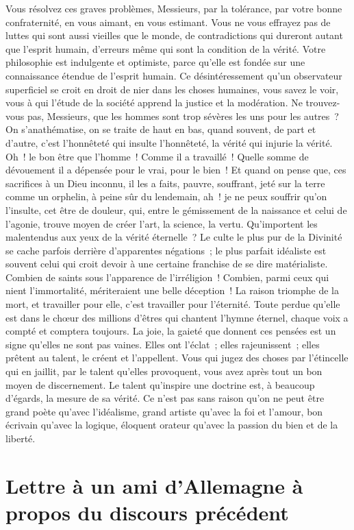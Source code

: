\documentclass[french,twoside]{book} %
\newcommand\persName[1]{#1}
\newcommand\placeName[1]{#1}
\begin{document}
Vous résolvez ces graves problèmes, Messieurs, par la tolérance, par votre bonne confraternité, en vous aimant, en vous estimant. Vous ne vous effrayez pas de luttes qui sont aussi vieilles que le monde, de contradictions qui dureront autant que l’esprit humain, d’erreurs même qui sont la condition de la vérité. Votre philosophie est indulgente et optimiste, parce qu’elle est fondée sur une connaissance étendue de l’esprit humain. Ce désintéressement qu’un observateur superficiel se croit en droit de nier dans les choses humaines, vous savez le voir, vous à qui l’étude de la société apprend la justice et la modération. Ne trouvez-vous pas, Messieurs, que les hommes sont trop sévères les uns pour les autres ? On s’anathématise, on se traite de haut en bas, quand souvent, de part et d’autre, c’est l’honnêteté qui insulte l’honnêteté, la vérité qui injurie la vérité. Oh ! le bon être que l’homme ! Comme il a travaillé ! Quelle somme de dévouement il a dépensée pour le vrai, pour le bien ! Et quand on pense que, ces sacrifices à un Dieu inconnu, il les a faits, pauvre, souffrant, jeté sur la terre comme un orphelin, à peine sûr du lendemain, ah ! je ne peux souffrir qu’on l’insulte, cet être de douleur, qui, entre le gémissement de la naissance et celui de l’agonie, trouve moyen de créer l’art, la science, la vertu. Qu’importent les malentendus aux yeux de la vérité éternelle ? Le culte le plus pur de la {\persName Divinité} se cache parfois derrière d’apparentes négations ; le plus parfait idéaliste est souvent celui qui croit devoir à une certaine franchise de se dire matérialiste. Combien de saints sous l’apparence de l’irréligion ! Combien, parmi ceux qui nient l’immortalité, mériteraient une belle déception ! La raison triomphe de la mort, et travailler pour elle, c’est travailler pour l’éternité. Toute perdue qu’elle est dans le chœur des millions d’êtres qui chantent l’hymne éternel, chaque voix a compté et comptera toujours. La joie, la gaieté que donnent ces pensées est un signe qu’elles ne sont pas vaines. Elles ont l’éclat ; elles rajeunissent ; elles prêtent au talent, le créent et l’appellent. Vous qui jugez des choses par l’étincelle qui en jaillit, par le talent qu’elles provoquent, vous avez après tout un bon moyen de discernement. Le talent qu’inspire une doctrine est, à beaucoup d’égards, la mesure de sa vérité. Ce n’est pas sans raison qu’on ne peut être grand poète qu’avec l’idéalisme, grand artiste qu’avec la foi et l’amour, bon écrivain qu’avec la logique, éloquent orateur qu’avec la passion du bien et de la liberté.
\section[{Lettre à un ami d’Allemagne à propos du discours précédent}]{Lettre à un ami d’{\placeName Allemagne} à propos du discours précédent}\renewcommand{\leftmark}{Lettre à un ami d’{\placeName Allemagne} à propos du discours précédent}
\end{document}
